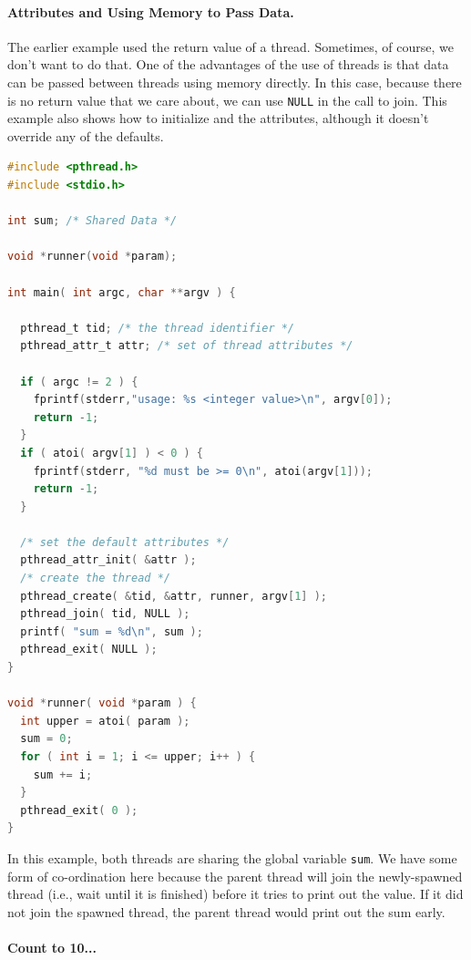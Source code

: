 \paragraph{Attributes and Using Memory to Pass Data.}
The earlier example used the return value of a thread. Sometimes, of course, we don't want to do that. One of the advantages of the use of threads is that data can be passed between threads using memory directly. In this case, because there is no return value that we care about, we can use \texttt{NULL} in the call to join. This example also shows how to initialize and the attributes, although it doesn't override any of the defaults.


\begin{lstlisting}[language=C]
#include <pthread.h>
#include <stdio.h>

int sum; /* Shared Data */

void *runner(void *param);

int main( int argc, char **argv ) {

  pthread_t tid; /* the thread identifier */
  pthread_attr_t attr; /* set of thread attributes */

  if ( argc != 2 ) {
    fprintf(stderr,"usage: %s <integer value>\n", argv[0]); 
    return -1;
  }
  if ( atoi( argv[1] ) < 0 ) {
    fprintf(stderr, "%d must be >= 0\n", atoi(argv[1])); 
    return -1;
  }

  /* set the default attributes */
  pthread_attr_init( &attr );
  /* create the thread */
  pthread_create( &tid, &attr, runner, argv[1] );
  pthread_join( tid, NULL ); 
  printf( "sum = %d\n", sum );
  pthread_exit( NULL );
}

void *runner( void *param ) {
  int upper = atoi( param );
  sum = 0;
  for ( int i = 1; i <= upper; i++ ) {
    sum += i;
  }
  pthread_exit( 0 );
}
\end{lstlisting}

In this example, both threads are sharing the global variable \texttt{sum}. We have some form of co-ordination here because the parent thread will join the newly-spawned thread (i.e., wait until it is finished) before it tries to print out the value. If it did not join the spawned thread, the parent thread would print out the sum early.



\paragraph{Count to 10...}

